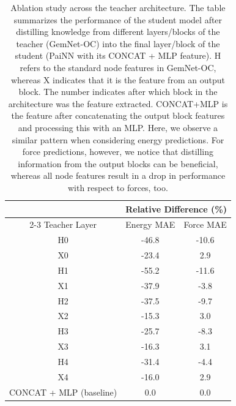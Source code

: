 \documentclass{article}
\begin{document}
\begin{table}[h]
\centering
\caption{Ablation study across the teacher architecture. The table summarizes the performance of the student model after distilling knowledge from different layers/blocks of the teacher (GemNet-OC) into the final layer/block of the student (PaiNN with its CONCAT + MLP feature). H refers to the standard node features in GemNet-OC, whereas X indicates that it is the feature from an output block. The number indicates after which block in the architecture was the feature extracted. CONCAT+MLP is the feature after concatenating the output block features and processing this with an MLP. Here, we observe a similar pattern when considering energy predictions. For force predictions, however, we notice that distilling information from the output blocks can be beneficial, whereas all node features result in a drop in performance with respect to forces, too.}
\label{tab:ablation2}
\begin{tabular}{ccc}
\multicolumn{1}{l}{}                         & \multicolumn{2}{c}{Relative Difference (\%)} \\ \cline{2-3} 
Teacher Layer                                        & Energy MAE            & Force MAE            \\ \hline
\multicolumn{1}{c|}{H0}                      & -46.8                 & -10.6                \\
\multicolumn{1}{c|}{X0}                      & -23.4                 & 2.9                  \\
\multicolumn{1}{c|}{H1}                      & -55.2                 & -11.6                \\
\multicolumn{1}{c|}{X1}                      & -37.9                 & -3.8                 \\
\multicolumn{1}{c|}{H2}                      & -37.5                 & -9.7                 \\
\multicolumn{1}{c|}{X2}                      & -15.3                 & 3.0                  \\
\multicolumn{1}{c|}{H3}                      & -25.7                 & -8.3                 \\
\multicolumn{1}{c|}{X3}                      & -16.3                 & 3.1                  \\
\multicolumn{1}{c|}{H4}                      & -31.4                  & -4.4                \\
\multicolumn{1}{c|}{X4}                      & -16.0                 & 2.9                  \\
\multicolumn{1}{c|}{CONCAT + MLP (baseline)} & 0.0                   & 0.0                 
\end{tabular}
\end{table}
\end{document}
